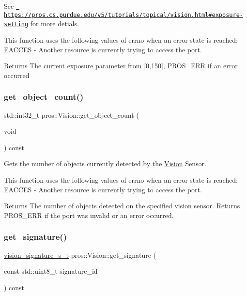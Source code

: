 See \href{https://pros.cs.purdue.edu/v5/tutorials/topical/vision.html\#exposure-setting}{\texttt{ https\+://pros.\+cs.\+purdue.\+edu/v5/tutorials/topical/vision.\+html\#exposure-\/setting}} for more detials.

This function uses the following values of errno when an error state is reached\+: E\+A\+C\+C\+ES -\/ Another resource is currently trying to access the port.

\begin{DoxyReturn}{Returns}
The current exposure parameter from \mbox{[}0,150\mbox{]}, P\+R\+O\+S\+\_\+\+E\+RR if an error occurred 
\end{DoxyReturn}
\mbox{\label{classpros_1_1Vision_a73869f85b3d2e468ffc51957d80f5a75}} 
\subsubsection{\texorpdfstring{get\_object\_count()}{get\_object\_count()}}
{\footnotesize\ttfamily std\+::int32\+\_\+t pros\+::\+Vision\+::get\+\_\+object\+\_\+count (\begin{DoxyParamCaption}\item[{void}]{ }\end{DoxyParamCaption}) const}



Gets the number of objects currently detected by the \mbox{\hyperlink{classpros_1_1Vision}{Vision}} Sensor. 

This function uses the following values of errno when an error state is reached\+: E\+A\+C\+C\+ES -\/ Another resource is currently trying to access the port.

\begin{DoxyReturn}{Returns}
The number of objects detected on the specified vision sensor. Returns P\+R\+O\+S\+\_\+\+E\+RR if the port was invalid or an error occurred. 
\end{DoxyReturn}
\mbox{\label{classpros_1_1Vision_af1d1bc18fd7dacfd23d9dfc403b7d419}} 
\subsubsection{\texorpdfstring{get\_signature()}{get\_signature()}}
{\footnotesize\ttfamily \mbox{\hyperlink{vision_8h_a135c729c7277f6cc019c2924088a5fd5}{vision\+\_\+signature\+\_\+s\+\_\+t}} pros\+::\+Vision\+::get\+\_\+signature (\begin{DoxyParamCaption}\item[{const std\+::uint8\+\_\+t}]{signature\+\_\+id }\end{DoxyParamCaption}) const}



